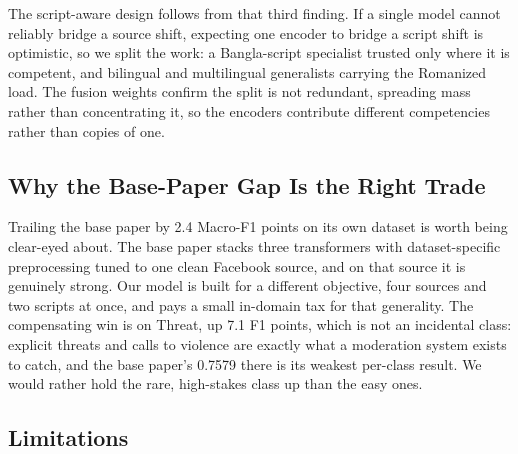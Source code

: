 \documentclass[11pt,a4paper]{article}
\def\emph#1{#1}%
\begin{document}
The script-aware design follows from that third finding. If a single model cannot reliably bridge a source shift, expecting one encoder to bridge a script shift is optimistic, so we split the work: a Bangla-script specialist trusted only where it is competent, and bilingual and multilingual generalists carrying the Romanized load. The fusion weights confirm the split is not redundant, spreading mass rather than concentrating it, so the encoders contribute different competencies rather than copies of one.

\subsection{Why the Base-Paper Gap Is the Right Trade}
\label{sec:discussion-basepaper}

Trailing the base paper by 2.4 Macro-F1 points on its own dataset is worth being clear-eyed about. The base paper stacks three transformers with dataset-specific preprocessing tuned to one clean Facebook source, and on that source it is genuinely strong. Our model is built for a different objective, four sources and two scripts at once, and pays a small in-domain tax for that generality. The compensating win is on \emph{Threat}, up 7.1 F1 points, which is not an incidental class: explicit threats and calls to violence are exactly what a moderation system exists to catch, and the base paper's 0.7579 there is its weakest per-class result. We would rather hold the rare, high-stakes class up than the easy ones.

\subsection{Limitations}
\label{sec:limitations}
\end{document}
